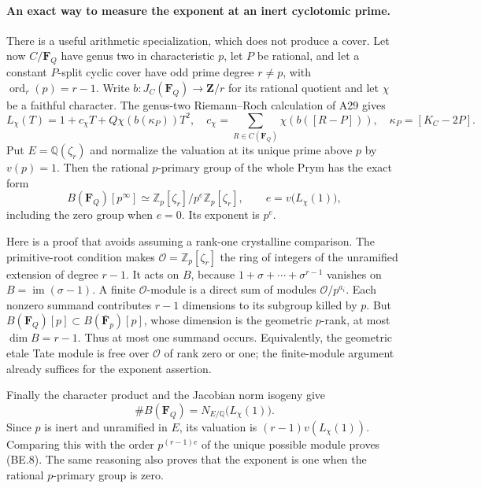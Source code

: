\paragraph{An exact way to measure the exponent at an inert cyclotomic prime.}
There is a useful arithmetic specialization, which does not
produce a cover. Let now $C/\mathbf F_Q$ have genus two in
characteristic $p$, let $P$ be rational, and let a constant
$P$-split cyclic cover have odd prime degree $r\ne p$, with
$\operatorname{ord}_r(p)=r-1$. Write $b:J_C(\mathbf F_Q)\to
\mathbf Z/r$ for its rational quotient and let $\chi$ be a
faithful character. The genus-two Riemann--Roch calculation
of A29 gives
\[
 L_\chi(T)=1+c_\chi T+Q\chi(b(\kappa_P))T^2,
 \quad c_\chi=\sum_{R\in C(\mathbf F_Q)}\chi(b([R-P])),
 \quad \kappa_P=[K_C-2P].
 \tag{BE.7}
\]
Put $E=\mathbb Q(\zeta_r)$ and normalize the valuation at
its unique prime above $p$ by $v(p)=1$. Then the rational
$p$-primary group of the whole Prym has the exact form
\[
 B(\mathbf F_Q)[p^\infty]\simeq
       \mathbb Z_p[\zeta_r]/p^e\mathbb Z_p[\zeta_r],
       \qquad e=v\bigl(L_\chi(1)\bigr),
 \tag{BE.8}
\]
including the zero group when $e=0$. Its exponent is $p^e$.

Here is a proof that avoids assuming a rank-one crystalline
comparison. The primitive-root condition makes
$\mathcal O=\mathbb Z_p[\zeta_r]$ the ring of integers of
the unramified extension of degree $r-1$. It acts on $B$,
because $1+\sigma+\cdots+\sigma^{r-1}$ vanishes on
$B=\operatorname{im}(\sigma-1)$. A finite $\mathcal O$-module
is a direct sum of modules $\mathcal O/p^{a_i}$.
Each nonzero summand contributes $r-1$ dimensions to its
subgroup killed by $p$. But
$B(\mathbf F_Q)[p]\subset B(\overline{\mathbf F}_p)[p]$,
whose dimension is the geometric $p$-rank, at most
$\dim B=r-1$. Thus at most one summand occurs.
Equivalently, the geometric etale Tate module is free over
$\mathcal O$ of rank zero or one; the finite-module argument
already suffices for the exponent assertion.

Finally the character product and the Jacobian norm isogeny
give
\[
 \#B(\mathbf F_Q)=N_{E/\mathbb Q}\bigl(L_\chi(1)\bigr).
\]
Since $p$ is inert and unramified in $E$, its valuation is
$(r-1)v(L_\chi(1))$. Comparing this with the order
$p^{(r-1)e}$ of the unique possible module proves (BE.8).
The same reasoning also proves that the exponent is one
when the rational $p$-primary group is zero.

